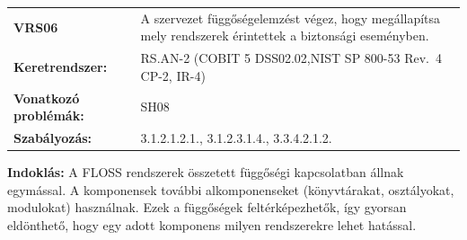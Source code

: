 \documentclass[12pt,magyar,a4paper,oneside]{scrreprt}
\begin{document}
\begin{longtable}[]{@{}ll@{}}
\toprule
\endhead
\begin{minipage}[t]{0.16\columnwidth}\raggedright
\textbf{VRS06}\strut
\end{minipage} & \begin{minipage}[t]{0.79\columnwidth}\raggedright
A szervezet függőségelemzést végez, hogy megállapítsa mely rendszerek
érintettek a biztonsági eseményben.\strut
\end{minipage}\tabularnewline
\begin{minipage}[t]{0.16\columnwidth}\raggedright
\textbf{Keretrendszer:}\strut
\end{minipage} & \begin{minipage}[t]{0.79\columnwidth}\raggedright
RS.AN-2 (COBIT 5 DSS02.02,NIST SP 800-53 Rev.~4 CP-2, IR-4)\strut
\end{minipage}\tabularnewline
\begin{minipage}[t]{0.16\columnwidth}\raggedright
\textbf{Vonatkozó problémák:}\strut
\end{minipage} & \begin{minipage}[t]{0.79\columnwidth}\raggedright
SH08\strut
\end{minipage}\tabularnewline
\begin{minipage}[t]{0.16\columnwidth}\raggedright
\textbf{Szabályozás:}\strut
\end{minipage} & \begin{minipage}[t]{0.79\columnwidth}\raggedright
3.1.2.1.2.1., 3.1.2.3.1.4., 3.3.4.2.1.2.\strut
\end{minipage}\tabularnewline
\bottomrule
\end{longtable}

\textbf{Indoklás: } A FLOSS rendszerek összetett függőségi kapcsolatban
állnak egymással. A komponensek további alkomponenseket (könyvtárakat,
osztályokat, modulokat) használnak. Ezek a függőségek feltérképezhetők,
így gyorsan eldönthető, hogy egy adott komponens milyen rendszerekre
lehet hatással.
\end{document}
